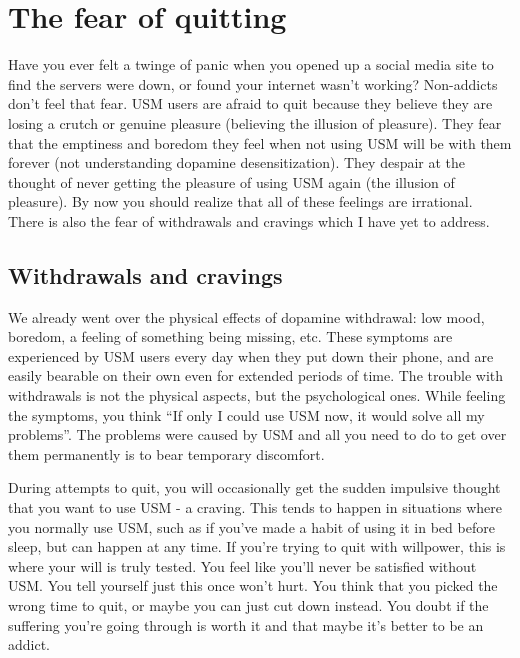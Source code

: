 \documentclass[
  openany]{book}
\begin{document}
\section{The fear of quitting}\label{the-fear-of-quitting}

Have you ever felt a twinge of panic when you opened up a social media site to find the servers were down, or found your internet wasn't working? Non-addicts don't feel that fear. USM users are afraid to quit because they believe they are losing a crutch or genuine pleasure (believing the illusion of pleasure). They fear that the emptiness and boredom they feel when not using USM will be with them forever (not understanding dopamine desensitization). They despair at the thought of never getting the pleasure of using USM again (the illusion of pleasure). By now you should realize that all of these feelings are irrational. There is also the fear of withdrawals and cravings which I have yet to address.

\subsection{Withdrawals and cravings}\label{withdrawals-and-cravings}

We already went over the physical effects of dopamine withdrawal: low mood, boredom, a feeling of something being missing, etc. These symptoms are experienced by USM users every day when they put down their phone, and are easily bearable on their own even for extended periods of time. The trouble with withdrawals is not the physical aspects, but the psychological ones. While feeling the symptoms, you think ``If only I could use USM now, it would solve all my problems''. The problems were caused by USM and all you need to do to get over them permanently is to bear temporary discomfort.

During attempts to quit, you will occasionally get the sudden impulsive thought that you want to use USM - a craving. This tends to happen in situations where you normally use USM, such as if you've made a habit of using it in bed before sleep, but can happen at any time. If you're trying to quit with willpower, this is where your will is truly tested. You feel like you'll never be satisfied without USM. You tell yourself just this once won't hurt. You think that you picked the wrong time to quit, or maybe you can just cut down instead. You doubt if the suffering you're going through is worth it and that maybe it's better to be an addict.
\end{document}
